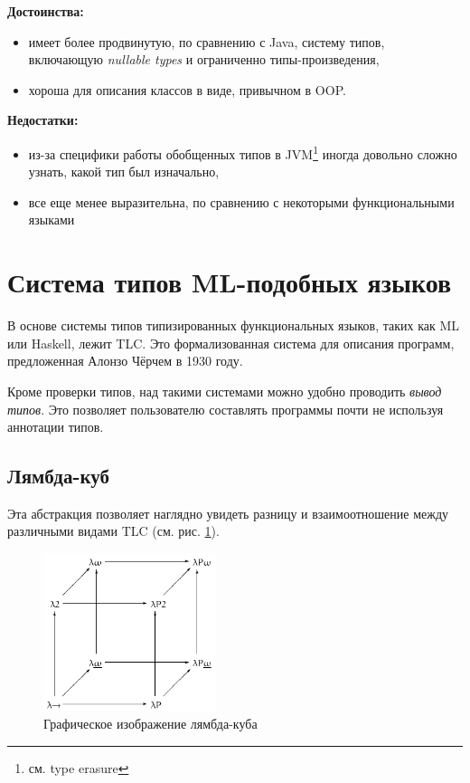 \textbf{Достоинства:}
\begin{itemize}
    \item имеет более продвинутую, по сравнению с Java, систему типов, включающую \textit{nullable types} и ограниченно типы-произведения,
    \item хороша для описания классов в виде, привычном в \gls{OOP}.
\end{itemize}

\textbf{Недостатки:}
\begin{itemize}
    \item из-за специфики работы обобщенных типов в \gls{JVM}\footnote{см. type erasure} иногда довольно сложно узнать, какой тип был изначально,
    \item все еще менее выразительна, по сравнению с некоторыми функциональными языками
\end{itemize}

\section{Система типов ML-подобных языков}
\label{sec:ml_type_system}

В основе системы типов типизированных функциональных языков, таких как ML или Haskell, лежит \gls{TLC}.
Это формализованная система для описания программ, предложенная Алонзо Чёрчем в 1930 году.

Кроме проверки типов, над такими системами можно удобно проводить \textit{вывод типов}.
Это позволяет пользователю составлять программы почти не используя аннотации типов.

\subsection{Лямбда-куб}
\label{subsec:lambda_cube}

Эта абстракция позволяет наглядно увидеть разницу и взаимоотношение между различными видами \gls{TLC} (см. рис. \ref{fig:lambda_cube}).

\begin{figure}[H]
    \centering
    \includegraphics[width=0.45\textwidth]{figures/Lambda_cube}
    \caption{Графическое изображение лямбда-куба}
    \label{fig:lambda_cube}
\end{figure}

